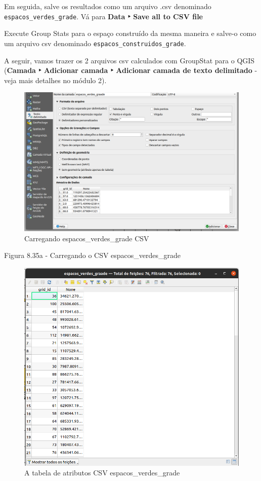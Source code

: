 \documentclass[
]{book}
\begin{document}
Em seguida, salve os resultados como um arquivo .csv denominado \texttt{espacos\_verdes\_grade}. Vá para \textbf{Data ‣ Save all to CSV file}

Execute Group Stats para o espaço construído da mesma maneira e salve-o como um arquivo csv denominado \texttt{espacos\_construidos\_grade}.

A seguir, vamos trazer os 2 arquivos csv calculados com GroupStat para o QGIS (\textbf{Camada ‣ Adicionar camada ‣ Adicionar camada de texto delimitado} - veja mais detalhes no módulo 2).

\begin{figure}
\centering
\includegraphics{media/modulo8/fig835_a.png}
\caption{Carregando espacos\_verdes\_grade CSV}
\end{figure}

Figura 8.35a - Carregando o CSV espacos\_verdes\_grade

\begin{figure}
\centering
\includegraphics{media/modulo8/fig835_b.png}
\caption{A tabela de atributos CSV espacos\_verdes\_grade}
\end{figure}
\end{document}
